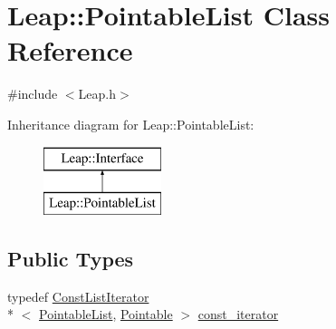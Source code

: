 \hypertarget{class_leap_1_1_pointable_list}{\section{Leap\+:\+:Pointable\+List Class Reference}
\label{class_leap_1_1_pointable_list}
}


{\ttfamily \#include $<$Leap.\+h$>$}

Inheritance diagram for Leap\+:\+:Pointable\+List\+:\begin{figure}[H]
\begin{center}
\leavevmode
\includegraphics[height=2.000000cm]{class_leap_1_1_pointable_list}
\end{center}
\end{figure}
\subsection*{Public Types}
\begin{DoxyCompactItemize}
\item 
typedef \hyperlink{class_leap_1_1_const_list_iterator}{Const\+List\+Iterator}\\*
$<$ \hyperlink{class_leap_1_1_pointable_list}{Pointable\+List}, \hyperlink{class_leap_1_1_pointable}{Pointable} $>$ \hyperlink{class_leap_1_1_pointable_list_a12b640b8c7e70885884a3a6ee903c21c}{const\+\_\+iterator}
\end{DoxyCompactItemize}
